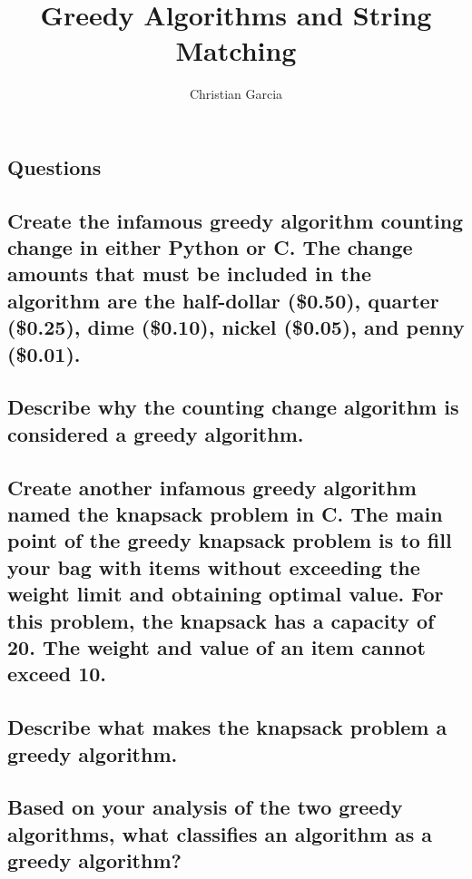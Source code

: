 \documentclass{article}
\title{Greedy Algorithms and String Matching}
\author{Christian Garcia}
\begin{document}
\maketitle


\begin{Huge}
\section{Questions}
\end{Huge}


\subsection{Create the infamous greedy algorithm counting change in either Python or C. The change amounts that must be included in the algorithm are the half-dollar (\$0.50), quarter (\$0.25), dime (\$0.10), nickel (\$0.05), and penny (\$0.01).}

\vspace{24pt}

\subsection{Describe why the counting change algorithm is considered a greedy algorithm.}

\pagebreak{}

\subsection{Create another infamous greedy algorithm named the knapsack problem in C. The main point of the greedy knapsack problem is to fill your bag with items without exceeding the weight limit and obtaining optimal value. For this problem, the knapsack has a capacity of 20. The weight and value of an item cannot exceed 10. }

\vspace{24pt}

\subsection{Describe what makes the knapsack problem a greedy algorithm.}

\vspace{144pt}

\subsection{Based on your analysis of the two greedy algorithms, what classifies an algorithm as a greedy algorithm?}

\pagebreak{}
\end{document}

